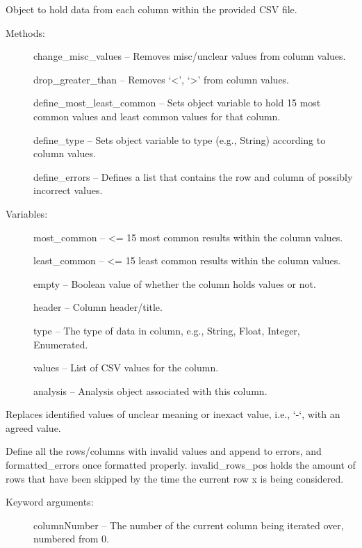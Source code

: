 \documentclass[letterpaper,10pt,english]{sphinxmanual}
\begin{document}
\begin{fulllineitems}
\label{Code_rst/dat:data.Column}
Object to hold data from each column within the provided CSV file.
\begin{description}
\item[{Methods:}] \leavevmode
change\_misc\_values -- Removes misc/unclear values from column values.

drop\_greater\_than -- Removes `\textless{}', `\textgreater{}' from column values.

define\_most\_least\_common -- Sets object variable to hold 15 most common values
and least common values for that column.

define\_type -- Sets object variable to type (e.g., String) according
to column values.

define\_errors -- Defines a list that contains the row and column of possibly
incorrect values.

\item[{Variables:}] \leavevmode
most\_common -- \textless{}= 15 most common results within the column values.

least\_common -- \textless{}= 15 least common results within the column values.

empty -- Boolean value of whether the column holds values or not.

header -- Column header/title.

type -- The type of data in column, e.g., String, Float, Integer,
Enumerated.

values -- List of CSV values for the column.

analysis -- Analysis object associated with this column.

\end{description}

\begin{fulllineitems}
\label{Code_rst/dat:data.Column.change_misc_values}
Replaces identified values of unclear meaning or inexact value, i.e., 
`-`, with an agreed value.

\end{fulllineitems}


\begin{fulllineitems}
\label{Code_rst/dat:data.Column.define_errors}
Define all the rows/columns with invalid values and append to errors, and
formatted\_errors once formatted properly. invalid\_rows\_pos holds the amount of
rows that have been skipped by the time the current row x is being considered.
\begin{description}
\item[{Keyword arguments:}] \leavevmode
columnNumber -- The number of the current column being iterated over, numbered
from 0.


\end{description}
\end{fulllineitems}
\end{fulllineitems}
\end{document}
